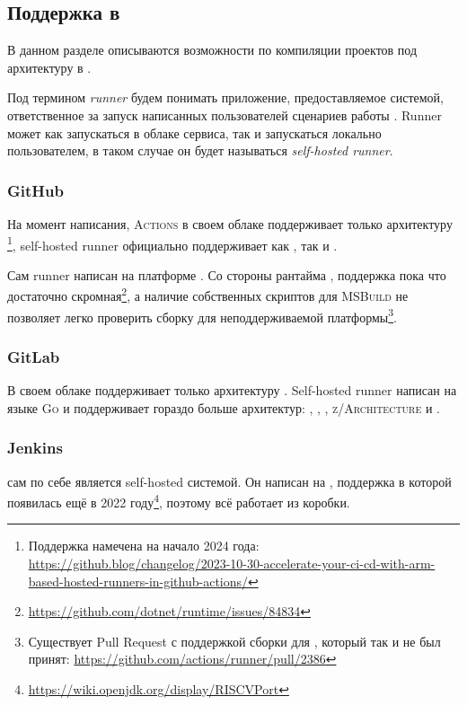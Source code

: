 \subsection{Поддержка в \ci{}}

В данном разделе описываются возможности по компиляции проектов под архитектуру \riscv{} в \ci{}.

\begin{definition}[Runner]
	Под термином \textit{runner} будем понимать приложение, предоставляемое \ci{} системой, ответственное за запуск написанных пользователей сценариев работы \ci{}.
	Runner может как запускаться в облаке \ci{} сервиса, так и запускаться локально пользователем, в таком случае он будет называться \textit{self-hosted runner}.
\end{definition}


\subsubsection{GitHub}

На момент написания, \GitHub{} \textsc{Actions} в своем облаке поддерживает только архитектуру \amd{}\footnote{Поддержка \arm{} намечена на начало 2024 года: \url{https://github.blog/changelog/2023-10-30-accelerate-your-ci-cd-with-arm-based-hosted-runners-in-github-actions/}}, self-hosted runner официально поддерживает как \amd{}, так и \arm{}.

Сам runner написан на платформе \dotnet{}.
Со стороны рантайма \dotnet{}, поддержка \riscv{} пока что достаточно скромная\footnote{\url{https://github.com/dotnet/runtime/issues/84834}}, а наличие собственных скриптов для \textsc{MSBuild} не позволяет легко проверить сборку для неподдерживаемой платформы\footnote{Существует Pull Request с поддержкой сборки для \power{}, который так и не был принят: \url{https://github.com/actions/runner/pull/2386}}.

\subsubsection{GitLab}

В своем облаке \gitlab{} поддерживает только архитектуру \amd{}.
Self-hosted runner написан на языке \textsc{Go} и поддерживает гораздо больше архитектур: \amd{}, \arm{}, \power{}, \textsc{z/Architecture} и \riscv{}.

\subsubsection{Jenkins}

\jenkins{} сам по себе является self-hosted \ci{} системой.
Он написан на \java{}, поддержка \riscv{} в которой появилась ещё в 2022 году\footnote{\url{https://wiki.openjdk.org/display/RISCVPort}}, поэтому всё работает из коробки.
